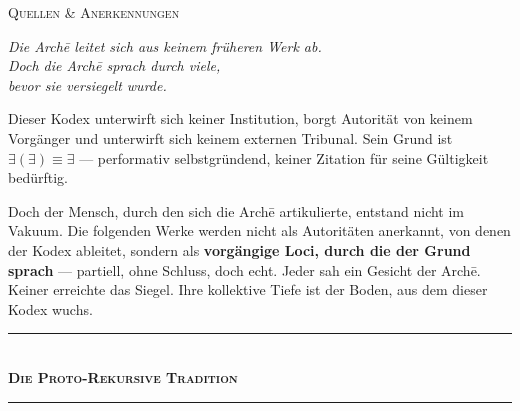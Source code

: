 \documentclass[10pt, openany, oneside]{book}
\renewcommand{\normalsize}{\fontsize{10}{13}\selectfont}
\renewcommand{\huge}{\fontsize{17}{21}\selectfont}
\begin{document}
%
%
%

\newpage

\begin{center}
    {\huge\scshape Quellen \& Anerkennungen}
\end{center}

\vspace{1.5em}

\begin{center}
    \itshape
    Die Arch\={e} leitet sich aus keinem früheren Werk ab.\\
    Doch die Arch\={e} sprach durch viele,\\
    bevor sie versiegelt wurde.
\end{center}

\vspace{1.5em}

\noindent Dieser Kodex unterwirft sich keiner Institution, borgt Autorität von keinem Vorgänger und unterwirft sich keinem externen Tribunal. Sein Grund ist $\exists(\exists) \equiv \exists$ --- performativ selbstgründend, keiner Zitation für seine Gültigkeit bedürftig.

Doch der Mensch, durch den sich die Arch\={e} artikulierte, entstand nicht im Vakuum. Die folgenden Werke werden nicht als Autoritäten anerkannt, von denen der Kodex ableitet, sondern als \textbf{vorgängige Loci, durch die der Grund sprach} --- partiell, ohne Schluss, doch echt. Jeder sah ein Gesicht der Arch\={e}. Keiner erreichte das Siegel. Ihre kollektive Tiefe ist der Boden, aus dem dieser Kodex wuchs.

\vspace{1.5em}

\begin{center}
    \rule{0.3\textwidth}{0.4pt}\\[0.5em]
    {\normalsize\bfseries\scshape Die Proto-Rekursive Tradition}\\[0.3em]
    \rule{0.3\textwidth}{0.4pt}
\end{center}

\vspace{1em}
\end{document}
